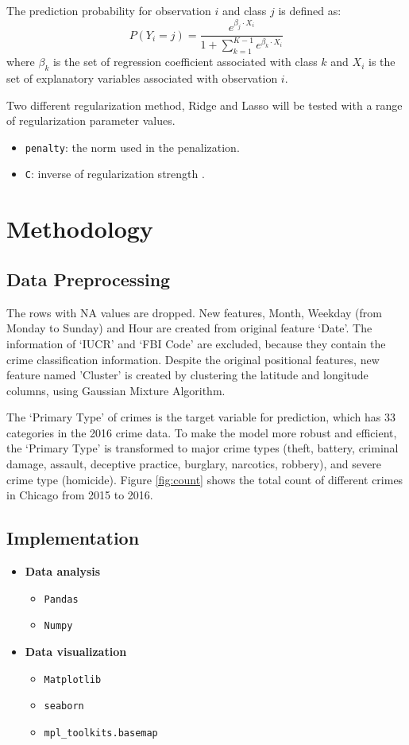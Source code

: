 \documentclass[12pt]{article}
\begin{document}
The prediction probability for observation $i$ and class $j$ is defined as:
\begin{equation}
P(Y_i = j) = \frac{e^{\beta_j \cdot X_i}}{1+\sum_{k=1}^{K-1}e^{\beta_k \cdot X_i} }
\end{equation}
where $\beta_k$ is the set of regression coefficient associated with class $k$ and $X_i$ is the set of explanatory variables associated with observation $i$.

Two different regularization method, Ridge and Lasso will be tested with a range of regularization parameter values.
\begin{itemize}
\item \verb|penalty|: the norm used in the penalization.
\item \verb|C|: inverse of regularization strength .
\end{itemize}

\section{Methodology}
\subsection{Data Preprocessing}
The rows with NA values are dropped. New features, Month, Weekday (from Monday to Sunday) and Hour are created from original feature ‘Date’. The information of ‘IUCR’ and ‘FBI Code’ are excluded, because they contain the crime classification information. Despite the original positional features, new feature named 'Cluster' is created by clustering the latitude and longitude columns, using Gaussian Mixture Algorithm. 

The ‘Primary Type’ of crimes is the target variable for prediction, which has 33 categories in the 2016 crime data. To make the model more robust and efficient, the ‘Primary Type’ is transformed to major crime types (theft, battery, criminal damage, assault, deceptive practice, burglary, narcotics, robbery), and severe crime type (homicide). Figure \ref{fig:count} shows the total count of different crimes in Chicago from 2015 to 2016.

\subsection{Implementation}
\begin{itemize}
\item{\bf Data analysis} 
	\begin{itemize}
	\item \verb|Pandas|
	\item \verb|Numpy|
	\end{itemize}
\item{\bf Data visualization} 
	\begin{itemize}
	\item \verb|Matplotlib|
	\item \verb|seaborn|
	\item \verb|mpl_toolkits.basemap|
	\end{itemize}
\end{itemize}
\end{document}

